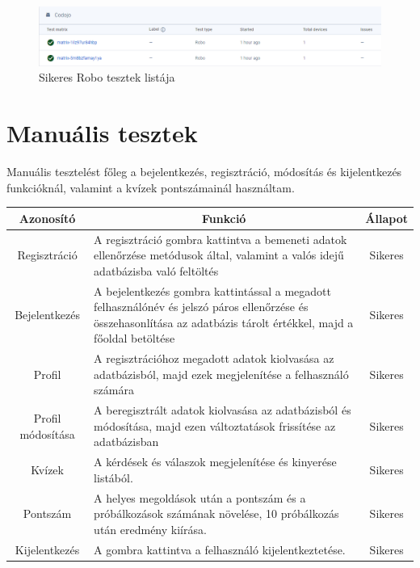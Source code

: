 \documentclass{thesis-ekf}
\begin{document}
\begin{figure}[tbh]
	\centering
	\includegraphics[width=1.0\linewidth]{teszteles}
	\caption{Sikeres Robo tesztek listája}
	\label{teszteles}
\end{figure}

\section{Manuális tesztek}
Manuális tesztelést főleg a bejelentkezés, regisztráció, módosítás és kijelentkezés funkcióknál, valamint a kvízek pontszámainál használtam.

\begin{tabular}{|p{2cm}|p{9cm}|p{3cm}|}
	\hline
	\multicolumn{1}{|c|}{Azonosító} & \multicolumn{1}{c|}{Funkció} & \multicolumn{1}{c|}{Állapot} \\
	\hline
	\multicolumn{1}{|c|}{Regisztráció} & A regisztráció gombra kattintva a bemeneti adatok ellenőrzése metódusok által, valamint a valós idejű adatbázisba való feltöltés & \multicolumn{1}{c|}{Sikeres} \\
	\hline
	\multicolumn{1}{|c|}{Bejelentkezés} & A bejelentkezés gombra kattintással a megadott felhasználónév és jelszó páros ellenőrzése és összehasonlítása az adatbázis tárolt értékkel, majd a főoldal betöltése & \multicolumn{1}{c|}{Sikeres}  \\
	\hline
	\multicolumn{1}{|c|}{Profil} & A regisztrációhoz megadott adatok kiolvasása az adatbázisból, majd ezek megjelenítése a felhasználó számára & \multicolumn{1}{c|}{Sikeres}  \\
	\hline
	\multicolumn{1}{|c|}{Profil módosítása} & A beregisztrált adatok kiolvasása az adatbázisból és módosítása, majd ezen változtatások frissítése az adatbázisban & \multicolumn{1}{c|}{Sikeres}  \\
	\hline
	\multicolumn{1}{|c|}{Kvízek} & A kérdések és válaszok megjelenítése és kinyerése listából. & \multicolumn{1}{c|}{Sikeres}  \\
	\hline
	\multicolumn{1}{|c|}{Pontszám} & A helyes megoldások után a pontszám és a próbálkozások számának növelése, 10 próbálkozás után eredmény kiírása. & \multicolumn{1}{c|}{Sikeres}  \\
	\hline
	\multicolumn{1}{|c|}{Kijelentkezés} & A gombra kattintva a felhasználó kijelentkeztetése. & \multicolumn{1}{c|}{Sikeres}  \\
	\hline
\end{tabular}
\end{document}
